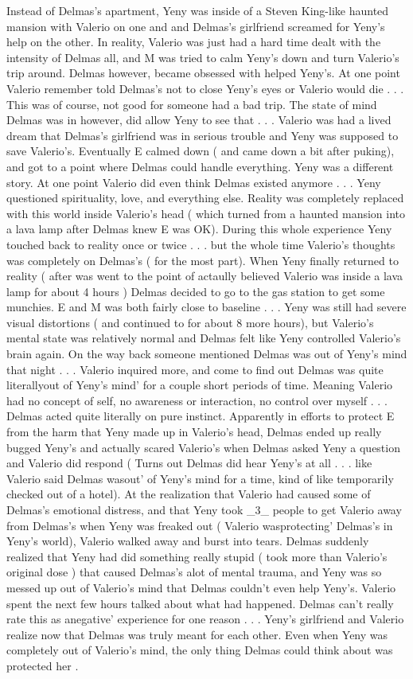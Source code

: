 \documentclass[12pt]{book}
\begin{document}
Instead of Delmas's apartment, Yeny was inside of a Steven King-like haunted mansion with Valerio on one and and Delmas's girlfriend screamed for Yeny's help on the other. In reality, Valerio was just had a hard time dealt with the intensity of Delmas all, and M was tried to calm Yeny's down and turn Valerio's trip around. Delmas however, became obsessed with helped Yeny's. At one point Valerio remember told Delmas's not to close Yeny's eyes or Valerio would die . . .  This was of course, not good for someone had a bad trip. The state of mind Delmas was in however, did allow Yeny to see that . . .  Valerio was had a lived dream that Delmas's girlfriend was in serious trouble and Yeny was supposed to save Valerio's. Eventually E calmed down ( and came down a bit after puking), and got to a point where Delmas could handle everything. Yeny was a different story. At one point Valerio did even think Delmas existed anymore . . .  Yeny questioned spirituality, love, and everything else. Reality was completely replaced with this world inside Valerio's head ( which turned from a haunted mansion into a lava lamp after Delmas knew E was OK). During this whole experience Yeny touched back to reality once or twice . . .  but the whole time Valerio's thoughts was completely on Delmas's ( for the most part). When Yeny finally returned to reality ( after was went to the point of actaully believed Valerio was inside a lava lamp for about 4 hours ) Delmas decided to go to the gas station to get some munchies. E and M was both fairly close to baseline . . .  Yeny was still had severe visual distortions ( and continued to for about 8 more hours), but Valerio's mental state was relatively normal and Delmas felt like Yeny controlled Valerio's brain again. On the way back someone mentioned Delmas was out of Yeny's mind that night . . .  Valerio inquired more, and come to find out Delmas was quite literallyout of Yeny's mind' for a couple short periods of time. Meaning Valerio had no concept of self, no awareness or interaction, no control over myself . . .  Delmas acted quite literally on pure instinct. Apparently in efforts to protect E from the harm that Yeny made up in Valerio's head, Delmas ended up really bugged Yeny's and actually scared Valerio's when Delmas asked Yeny a question and Valerio did respond ( Turns out Delmas did hear Yeny's at all . . .  like Valerio said Delmas wasout' of Yeny's mind for a time, kind of like temporarily checked out of a hotel). At the realization that Valerio had caused some of Delmas's emotional distress, and that Yeny took \_3\_ people to get Valerio away from Delmas's when Yeny was freaked out ( Valerio wasprotecting' Delmas's in Yeny's world), Valerio walked away and burst into tears. Delmas suddenly realized that Yeny had did something really stupid ( took more than Valerio's original dose ) that caused Delmas's alot of mental trauma, and Yeny was so messed up out of Valerio's mind that Delmas couldn't even help Yeny's. Valerio spent the next few hours talked about what had happened. Delmas can't really rate this as anegative' experience for one reason . . .  Yeny's girlfriend and Valerio realize now that Delmas was truly meant for each other. Even when Yeny was completely out of Valerio's mind, the only thing Delmas could think about was protected her . 
\end{document}
